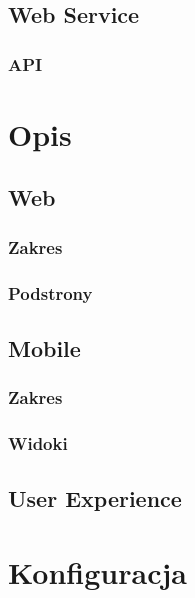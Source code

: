 \documentclass[11pt]{aghdpl}
\begin{document}
\section{Web Service}
\subsection{API}


\chapter{Opis}
\section{Web}
\subsection{Zakres}
\subsection{Podstrony}
\section{Mobile}
\subsection{Zakres}
\subsection{Widoki}
\section{User Experience}


\chapter{Konfiguracja}

% 
% 



%
%
%
%
\end{document}
